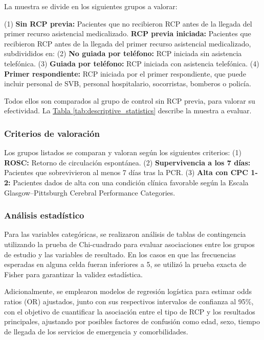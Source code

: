 \documentclass[10pt,a4paper]{article}
\begin{document}
\begin{multicols}{2}
La muestra se divide en los siguientes grupos a valorar:

(1) \textbf{Sin RCP previa:} Pacientes que no recibieron RCP antes de la llegada del primer recurso asistencial medicalizado.
\textbf{RCP previa iniciada:} Pacientes que recibieron RCP antes de la llegada del primer recurso asistencial medicalizado, subdivididos en:
(2) \textbf{No guiada por teléfono:} RCP iniciada sin asistencia telefónica.
(3) \textbf{Guiada por teléfono:} RCP iniciada con asistencia telefónica. 
(4) \textbf{Primer respondiente:} RCP iniciada por el primer respondiente, que puede incluir personal de SVB, personal hospitalario, socorristas, bomberos o policía.

Todos ellos son comparados al grupo de control sin RCP previa, para valorar su efectividad. La \hyperref[tab:descriptive_statistics]{Tabla \ref*{tab:descriptive_statistics}} describe la muestra a evaluar.


\subsubsection*{Criterios de valoración}

Los grupos listados se comparan y valoran según los siguientes criterios:
(1) \textbf{ROSC:} Retorno de circulación espontánea.
(2) \textbf{Supervivencia a los 7 días:} Pacientes que sobrevivieron al menos 7 días tras la PCR.
(3) \textbf{Alta con CPC 1-2:} Pacientes dados de alta con una condición clínica favorable según la Escala Glasgow–Pittsburgh Cerebral Performance Categories.

\subsubsection*{Análisis estadístico}
Para las variables categóricas, se realizaron análisis de tablas de contingencia utilizando la prueba de Chi-cuadrado para evaluar asociaciones entre los grupos de estudio y las variables de resultado. En los casos en que las frecuencias esperadas en alguna celda fueran inferiores a 5, se utilizó la prueba exacta de Fisher para garantizar la validez estadística. 

Adicionalmente, se emplearon modelos de regresión logística para estimar odds ratios (OR) ajustados, junto con sus respectivos intervalos de confianza al 95\%, con el objetivo de cuantificar la asociación entre el tipo de RCP y los resultados principales, ajustando por posibles factores de confusión como edad, sexo, tiempo de llegada de los servicios de emergencia y comorbilidades.


\end{multicols}
\end{document}

